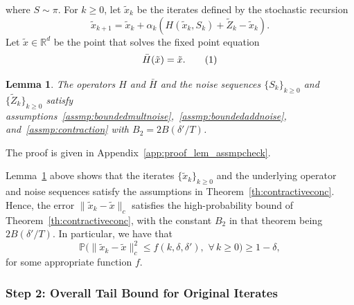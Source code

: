 \documentclass{article}
\newcommand{\numberthis}{\addtocounter{equation}{1}\tag{\theequation}}
\newcommand{\lrp}[1]{\left( #1 \right)}
\newcommand{\lrs}[1]{\left[ #1 \right]}
\newcommand{\E}[1]{\mathbb{E}\lrs{#1}}
\newtheorem{lemma}[theorem]{Lemma}
\begin{document}
where $S\sim\pi$. For $k\geq 0$, let $\tilde{x}_k$ be the iterates defined by the stochastic recursion
\[ \tilde{x}_{k+1} = \tilde{x}_k + \alpha_k\lrp{H(\tilde{x}_k, S_k) + \tilde{Z}_k - \tilde{x}_k }.\]
Let $\tilde{x}\in\mathbb{R}^d$ be the point that solves the fixed point equation
\[ %
\bar{H}(\tilde{x}) = \tilde{x}. \numberthis\label{eq:auxfixedpoint}  \]




\begin{lemma}\label{lem:assmpcheck}
The operators $H$ and $\bar{H}$ and the noise sequences $\{S_k\}_{k\geq 0}$ and $\{\tilde{Z}_k\}_{k\geq 0}$ satisfy assumptions~\ref{assmp:boundedmultnoise},~\ref{assmp:boundedaddnoise}, and~\ref{assmp:contraction} with $B_2 = 2B(\delta'/T)$.
\end{lemma}
The proof is given in Appendix~\ref{app:proof_lem_assmpcheck}.

\medskip

Lemma~\ref{lem:assmpcheck} above shows that the iterates $\{\tilde{x}_k\}_{k\geq 0}$ and the underlying operator and noise sequences satisfy the assumptions in Theorem~\ref{th:contractiveconc}. Hence, the error $\|\tilde{x}_k - \tilde{x}\|_c$ satisfies the high-probability bound of Theorem~\ref{th:contractiveconc}, with the constant $B_2$ in that theorem being $2B(\delta'/T)$. In particular, we have that
\begin{equation}\label{eq:aux_hpb}
    \mathbb{P}\Big(\|\tilde{x}_k-\tilde{x}\|_c^2 \leq f(k,\delta,\delta'), \,\, \forall\, k \geq 0 \Big) \geq 1-\delta,
\end{equation}
for some appropriate function $f$.











\subsubsection{Step 2: Overall Tail Bound for Original Iterates} 
\end{document}
